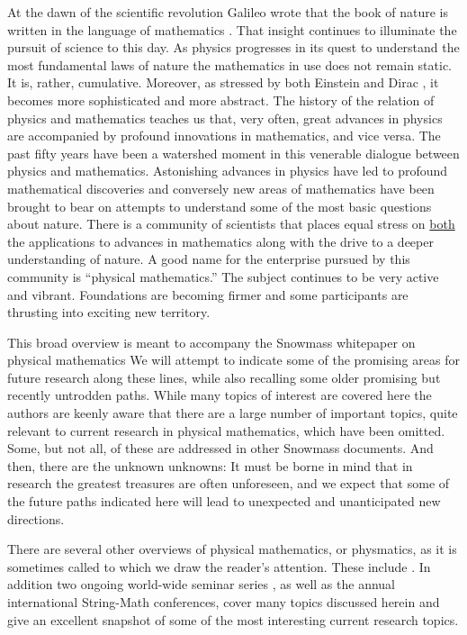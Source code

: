 \documentclass[12pt]{article}
\begin{document}
At the dawn of the scientific revolution Galileo wrote that the
book of nature is written in the language of mathematics \cite{Galileo,drake2016controversy}. That
insight continues to illuminate the pursuit of science to this day.
As physics progresses in its quest to understand the most fundamental
laws of nature the mathematics in use does not remain static. It is,
rather, cumulative. Moreover, as stressed by both Einstein \cite{Einstein_MTP} and Dirac \cite{dirac_1940}, it becomes more
sophisticated and more abstract. The history of  the relation of physics
and mathematics teaches us that, very often, great advances in physics are
accompanied by profound innovations in mathematics, and vice versa. The past fifty years
have been a watershed moment in this venerable dialogue between physics
and mathematics. Astonishing advances in physics have led to profound
mathematical discoveries and conversely new areas of mathematics
have been brought to bear on attempts to understand some of the most
basic questions about nature. There is a community of scientists
that places equal stress on \underline{both} the applications to advances in mathematics
along with the drive to a deeper understanding of nature. A good name for
the enterprise pursued by this community is ``physical mathematics.''
The subject continues to be very active and vibrant. Foundations are
becoming firmer and some participants are thrusting into exciting
new territory.


This broad overview is meant to accompany the Snowmass whitepaper 
on physical mathematics \cite{Bah:2022xfv} We  will attempt to indicate some of the
promising areas for future research along these lines, while also
recalling some older promising but recently untrodden paths.
While many topics of interest are covered here the authors are 
keenly aware that there are a large number of important topics, 
quite relevant to current research in physical mathematics, which have 
been omitted. Some, but not all, of these are addressed in other 
Snowmass documents.  And then, there are the unknown unknowns: 
It must 
be borne in mind that in research the greatest treasures are often
unforeseen, and we expect that some of the future paths indicated here
will lead to unexpected and unanticipated new directions.


There are several other overviews of physical mathematics, or physmatics, 
as it is sometimes called to which we draw the reader's attention. 
These include \cite{DysonMissedOpportunities, JaffeNotices, ConceptualFoundationsQFT,Jaffe:1993qt,
Atiyah:1994qu, Zaslow:2005jw, Moore:PhysMathFuture, Aganagic:2015tka, Morrison:2018zvt,YujiReview}. 
In addition two ongoing world-wide 
seminar series \cite{QFTandGeo,WHCGP}, as well as the annual 
international String-Math conferences, cover many topics discussed herein and give an excellent 
snapshot of some of the most interesting current research topics. 
\end{document}
